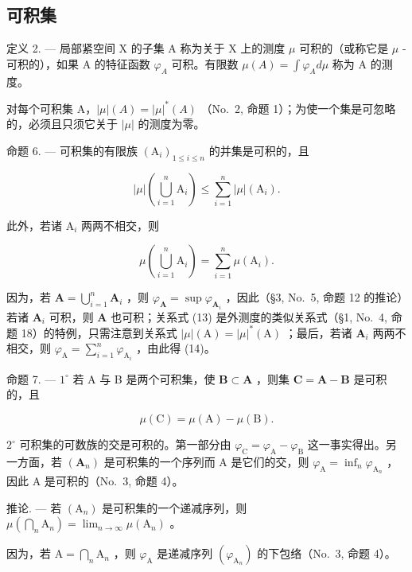 \subsection{可积集}

定义 2. --- 局部紧空间 X 的子集 A 称为关于 X 上的测度 \(\mu\) 可积的（或称它是 \(\mu\) -可积的），如果 A 的特征函数 \(\varphi_{A}\) 可积。有限数 \(\mu(A) = \int \varphi_{A} d\mu\) 称为 A 的测度。

对每个可积集 A，\(|\mu|(A) = |\mu|^{*}(A)\) （No.~2, 命题 1）；为使一个集是可忽略的，必须且只须它关于 \(|\mu|\) 的测度为零。

命题 6. --- 可积集的有限族 \((\mathrm{A}_{i})_{1\leqslant i\leqslant n}\) 的并集是可积的，且

\[
| \mu | \left(\bigcup_ {i = 1} ^ {n} \mathrm{A} _ {i}\right) \leqslant \sum_ {i = 1} ^ {n} | \mu | (\mathrm{A} _ {i}).\tag{13}
\]

此外，若诸 \(\mathrm{A}_i\) 两两不相交，则

\[
\mu \left(\bigcup_ {i = 1} ^ {n} \mathrm{A} _ {i}\right) = \sum_ {i = 1} ^ {n} \mu (\mathrm{A} _ {i}).\tag{14}
\]

因为，若 \(\mathbf{A} = \bigcup_{i=1}^{n} \mathbf{A}_i\) ，则 \(\varphi_{\mathbf{A}} = \sup \varphi_{\mathbf{A}_i}\) ，因此（§3, No.~5, 命题 12 的推论）若诸 \(\mathbf{A}_i\) 可积，则 \(\mathbf{A}\) 也可积；关系式 (13) 是外测度的类似关系式（§1, No.~4, 命题 18）的特例，只需注意到关系式 \(|\mu|(\mathrm{A}) = |\mu|^*(\mathrm{A})\) ；最后，若诸 \(\mathbf{A}_i\) 两两不相交，则 \(\varphi_{\mathrm{A}} = \sum_{i=1}^{n} \varphi_{\mathrm{A}_i}\) ，由此得 (14)。

命题 7. --- \(1^{\circ}\) 若 A 与 B 是两个可积集，使 \(\mathbf{B} \subset \mathbf{A}\) ，则集 \(\mathbf{C} = \mathbf{A} - \mathbf{B}\) 是可积的，且

\[
\mu (\mathrm{C}) = \mu (\mathrm{A}) - \mu (\mathrm{B}).\tag{15}
\]

\(2^{\circ}\) 可积集的可数族的交是可积的。第一部分由 \(\varphi_{\mathrm{C}} = \varphi_{\mathrm{A}} - \varphi_{\mathrm{B}}\) 这一事实得出。另一方面，若 \((\mathbf{A}_n)\) 是可积集的一个序列而 A 是它们的交，则 \(\varphi_{\mathrm{A}} = \inf_{n} \varphi_{\mathrm{A}_n}\) ，因此 A 是可积的（No.~3, 命题 4）。

推论. --- 若 \((\mathrm{A}_{n})\) 是可积集的一个递减序列，则 \(\mu(\bigcap_{n}\mathrm{A}_{n})=\lim_{n\to\infty}\mu(\mathrm{A}_{n})\) 。

因为，若 \(\mathrm{A} = \bigcap_{n}\mathrm{A}_{n}\) ，则 \(\varphi_{\mathrm{A}}\) 是递减序列 \((\varphi_{\mathrm{A}_n})\) 的下包络（No.~3, 命题 4）。

